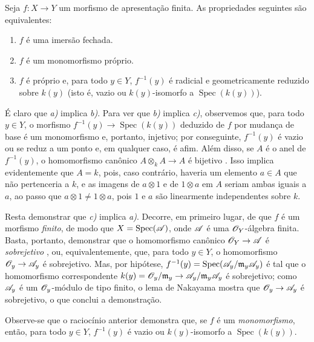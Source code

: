 \begin{proposition}[8.11.5]
\label{IV.8.11.5}
Seja $f:X\to Y$ um morfismo de apresentação finita.
As propriedades seguintes são equivalentes:
\begin{enumerate}[label=\emph{\alph*)}]
  \item $f$ é uma imersão fechada.
  \item $f$ é um monomorfismo próprio.
  \item $f$ é próprio e, para todo $y\in Y$, $f^{-1}(y)$ é radicial e geometricamente reduzido sobre $k(y)$ (isto é, vazio ou $k(y)$-isomorfo a $\operatorname{Spec}(k(y))$).
\end{enumerate}
\end{proposition}

É claro que \emph{a)} implica \emph{b)}.
Para ver que \emph{b)} implica \emph{c)}, observemos  que, para todo $y\in Y$, o morfismo $f^{-1}(y)\to\operatorname{Spec}(k(y))$ deduzido de $f$ por mudança de base é um monomorfismo e, portanto, injetivo; por conseguinte, $f^{-1}(y)$ é vazio ou se reduz a um ponto e, em qualquer caso, é afim.
Além disso, se $A$ é o anel de $f^{-1}(y)$, o homomorfismo canônico $A\otimes_k A\to A$ é bijetivo .
Isso implica evidentemente que $A=k$, pois, caso contrário, haveria um elemento $a\in A$ que não pertenceria a $k$, e as imagens de $a\otimes 1$ e de $1\otimes a$ em $A$ seriam ambas iguais a $a$, ao passo que $a\otimes 1\neq1\otimes a$, pois $1$ e $a$ são linearmente independentes sobre $k$.

Resta demonstrar que \emph{c)} implica \emph{a)}.
Decorre, em primeiro lugar, de  que $f$ é um morfismo \emph{finito}, de modo que $X=\operatorname{Spec}(\mathscr{A})$, onde $\mathscr{A}$ é uma $\mathscr{O}_Y$-álgebra finita.
Basta, portanto, demonstrar que o homomorfismo canônico $\sh{O}_Y\to\sh{A}$ é \emph{sobrejetivo} , ou, equivalentemente, que, para todo $y\in Y$, o homomorfismo $\sh{O}_y\to\sh{A}_y$ é sobrejetivo.
Mas, por hipótese,
$f^{-1}(y)=\operatorname{Spec}(\mathscr{A}_y/\mathfrak{m}_y\mathscr{A}_y)$  é tal que o homomorfismo correspondente $k(y)=\sh{O}_y/\mathfrak{m}_y\to\sh{A}_y/\mathfrak{m}_y\sh{A}_y$ é sobrejetivo; como $\mathscr{A}_y$ é um $\mathscr{O}_y$-módulo de tipo finito, o lema de Nakayama mostra que $\sh{O}_y\to\sh{A}_y$ é sobrejetivo, o que conclui a demonstração.

\begin{remark}[8.11.5.1]
\label{IV.8.11.5.1}
Observe-se que o raciocínio anterior demonstra que, se $f$ é um \emph{monomorfismo}, então, para todo $y\in Y$, $f^{-1}(y)$ é vazio ou $k(y)$-isomorfo a $\operatorname{Spec}(k(y))$.
\end{remark}

